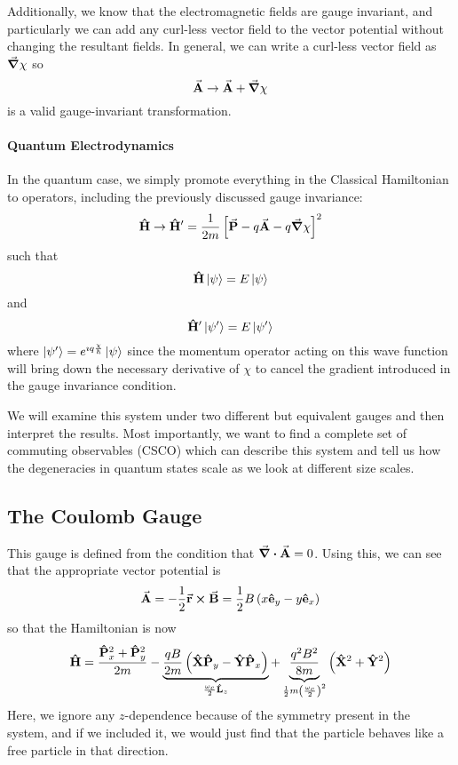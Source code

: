 \documentclass[a4paper,twoside,master.tex]{subfiles}
\begin{document}
Additionally, we know that the electromagnetic fields are gauge invariant, and particularly we can add any curl-less vector field to the vector potential without changing the resultant fields. In general, we can write a curl-less vector field as $ \grad{\chi} $ so
\begin{equation}
    \va{A} \to \va{A} + \grad{\chi}
\end{equation}
is a valid gauge-invariant transformation.

\paragraph{Quantum Electrodynamics}

In the quantum case, we simply promote everything in the Classical Hamiltonian to operators, including the previously discussed gauge invariance:
\begin{equation}
    \vu{H} \to \vu{H}' = \frac{1}{2m} \left[ \va{P} - q \va{A} - q \grad{\chi} \right]^2
\end{equation}
such that
\begin{equation}
    \vu{H}\ket{\psi} = E\ket{\psi}
\end{equation}
and
\begin{equation}
    \vu{H}'\ket{\psi'} = E\ket{\psi'}
\end{equation}
where $\ket{\psi'} = e^{\imath q \frac{\chi}{\hbar}}\ket{\psi} $ since the momentum operator acting on this wave function will bring down the necessary derivative of $ \chi $ to cancel the gradient introduced in the gauge invariance condition.

We will examine this system under two different but equivalent gauges and then interpret the results. Most importantly, we want to find a complete set of commuting observables (CSCO) which can describe this system and tell us how the degeneracies in quantum states scale as we look at different size scales.

\subsection{The Coulomb Gauge}
\label{sub:the_coulomb_gauge}

This gauge is defined from the condition that $ \div{ \va{A}} = 0 $. Using this, we can see that the appropriate vector potential is
\begin{equation}
    \va{A} = - \frac{1}{2} \va{r} \cross \va{B} = \frac{1}{2} B \left( x \vu{e}_y - y \vu{e}_x \right)
\end{equation}
so that the Hamiltonian is now
\begin{equation}
    \vu{H} = \frac{ \vu{P}_x^2 + \vu{P}_y^2}{2m} - \underbrace{\frac{qB}{2m} \left( \vu{X} \vu{P}_y - \vu{Y} \vu{P}_x \right)}_{\frac{\omega_c}{2} \vu{L}_z} + \underbrace{\frac{q^2 B^2}{8m}}_{\frac{1}{2} m \left( \frac{\omega_c}{2} \right)^2}
 \left( \vu{X}^2 + \vu{Y}^2 \right)
\end{equation}
Here, we ignore any $ z $-dependence because of the symmetry present in the system, and if we included it, we would just find that the particle behaves like a free particle in that direction.
\end{document}
